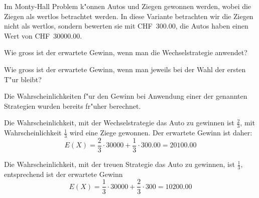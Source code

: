 Im Monty-Hall Problem k"onnen Autos und Ziegen gewonnen werden, wobei
die Ziegen als wertlos betrachtet werden. In diese Variante betrachten
wir die Ziegen nicht als wertlos, sondern bewerten sie mit CHF~300.00,
die Autos haben einen Wert von CHF~30000.00.
\begin{teilaufgaben}
\item Wie gross ist der erwartete Gewinn, wenn man die Wechselstrategie
anwendet?
\item Wie gross ist der erwartete Gewinn, wenn man jeweils bei der Wahl
der ersten T"ur bleibt?
\end{teilaufgaben}

\begin{loesung}
Die Wahrscheinlichkeiten f"ur den Gewinn bei Anwendung einer der
genannten Strategien wurden bereits fr"uher berechnet.
\begin{teilaufgaben}
\item
Die Wahrscheinlichkeit, mit der Wechselstrategie das Auto zu gewinnen
ist $\frac23$, mit Wahrscheinlichkeit $\frac13$ wird eine Ziege gewonnen.
Der erwartete Gewinn ist daher:
\[
E(X)=\frac23\cdot 30000+\frac13\cdot 300.00=20100.00
\]
\item
Die Wahrscheinlichkeit, mit der treuen Strategie das Auto zu
gewinnen, ist $\frac13$, entsprechend ist der erwartete Gewinn
\[
E(X)=\frac13\cdot 30000+\frac23\cdot 300=10200.00
\]
\end{teilaufgaben}
\end{loesung}

